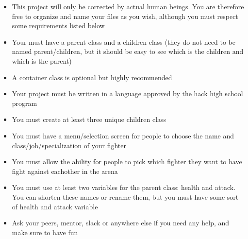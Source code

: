\documentclass{42-en}
\begin{document}
	    \begin{itemize}
		\item This project will only be corrected by actual human beings.
		You are therefore free to organize and name your files as you wish,
		although you must respect some requirements listed below
		\item Your must have a parent class and a children class (they do not
		need to be named parent/children, but it should be easy to see
		which is the children and which is the parent)
		\item A container class is optional but highly recommended
		
				
		
		\item Your project must be written in a language approved by
		the hack high school program
		\item You must create at least three unique children class
		\item You must have a menu/selection screen for people to choose
		the name and class/job/specialization of your fighter
		\item You must allow the ability for people to pick which fighter
		they want to have fight against eachother in the arena
		\item You must use at least two variables for the parent class:
		health and attack. You can shorten these names or rename them, but
		you must have some sort of health and attack variable
		\item Ask your peers, mentor, slack or anywhere else if you need
		any help, and make sure to have fun\\
	\end{itemize}



\end{document}
